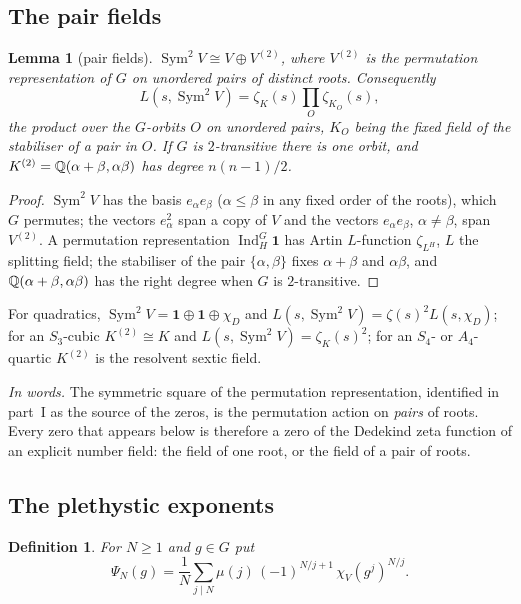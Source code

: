 \documentclass[11pt,a4paper]{article}
\newtheorem{lemma}[theorem]{Lemma}
\newtheorem{definition}[theorem]{Definition}
\theoremstyle{remark}\newtheorem{remark}[theorem]{Remark}
\newcommand{\Sym}{\operatorname{Sym}}\newcommand{\Res}{\operatorname*{Res}}
\begin{document}
\subsection{The pair fields}

\begin{lemma}[pair fields]\label{lem:pairs}
$\Sym^2V\cong V\oplus V^{(2)}$, where $V^{(2)}$ is the permutation representation of $G$ on unordered pairs
of distinct roots. Consequently
\[
L(s,\Sym^2V)=\zeta_K(s)\prod_{O}\zeta_{K_O}(s),
\]
the product over the $G$-orbits $O$ on unordered pairs, $K_O$ being the fixed field of the stabiliser of a
pair in $O$. If $G$ is $2$-transitive there is one orbit, and $K^{(2)}=\mathbb{Q}(\alpha+\beta,\alpha\beta)$ has
degree $n(n-1)/2$.
\end{lemma}
\begin{proof}
$\Sym^2V$ has the basis $e_\alpha e_\beta$ ($\alpha\le\beta$ in any fixed order of the roots), which $G$
permutes; the vectors $e_\alpha^2$ span a copy of $V$ and the vectors $e_\alpha e_\beta$, $\alpha\ne\beta$,
span $V^{(2)}$. A permutation representation $\operatorname{Ind}_H^G\mathbf 1$ has Artin $L$-function
$\zeta_{L^H}$, $L$ the splitting field; the stabiliser of the pair $\{\alpha,\beta\}$ fixes
$\alpha+\beta$ and $\alpha\beta$, and $\mathbb{Q}(\alpha+\beta,\alpha\beta)$ has the right degree when $G$ is
$2$-transitive.
\end{proof}

For quadratics, $\Sym^2V=\mathbf 1\oplus\mathbf 1\oplus\chi_D$ and $L(s,\Sym^2V)=\zeta(s)^2L(s,\chi_D)$; for an
$S_3$-cubic $K^{(2)}\cong K$ and $L(s,\Sym^2V)=\zeta_K(s)^2$; for an $S_4$- or $A_4$-quartic $K^{(2)}$ is the
resolvent sextic field.

\emph{In words.} The symmetric square of the permutation representation, identified in part~I as the
source of the zeros, is the permutation action on \emph{pairs} of roots. Every zero that appears below is
therefore a zero of the Dedekind zeta function of an explicit number field: the field of one root, or the
field of a pair of roots.

\subsection{The plethystic exponents}

\begin{definition}\label{def:psi}
For $N\ge1$ and $g\in G$ put
\[
\Psi_N(g)=\frac1N\sum_{j\mid N}\mu(j)\,(-1)^{N/j+1}\,\chi_V(g^j)^{N/j}.
\]
\end{definition}
\end{document}
